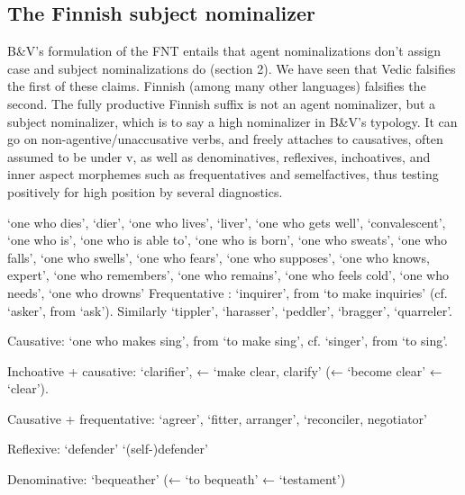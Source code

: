 \documentclass[output=paper,
modfonts
]{LSP/langsci}
\begin{document}
\subsection{The Finnish subject nominalizer }
\label{finnsectionja}
B\&V's formulation of the FNT entails that agent nominalizations don't assign case and subject
nominalizations do (section 2).  We have seen that Vedic falsifies the first of these claims.
Finnish (among many other languages) falsifies the second.  The fully productive Finnish suffix
 is not an agent nominalizer, but a subject nominalizer, which is to say a high
nominalizer in B\&V's typology.  It can go on non-agentive/unaccusative verbs, and freely
attaches to causatives, often assumed to be under v, as well as denominatives, reflexives,
inchoatives, and inner aspect morphemes such as frequentatives and semelfactives, thus testing
positively for high position by several diagnostics.
\begin{exe}
\ex
  \ea
   `one who dies', `dier',  `one who lives', `liver',
   `one who gets well', `convalescent',  `one who is',
   `one who is able to',  `one who is born', 
  `one who sweats',  `one who falls',  `one who swells',
   `one who fears',  `one who supposes',  `one
  who knows, expert',  `one who remembers',  `one who remains',
   `one who feels cold',  `one who needs', 
  `one who drowns'
\ex
	\ea Frequentative :  `inquirer', from  `to
  make inquiries' (cf.\  `asker', from  `ask'). Similarly
   `tippler',  `harasser', 
  `peddler',  `bragger',  `quarreler'.

	\ex Causative:  `one who makes sing', from  `to make
  sing', cf.  `singer', from  `to sing'.

	\ex Inchoative + causative:  `clarifier', ←  
  `make clear, clarify' (←  `become clear' ←  `clear'). 


	\ex Causative + frequentative:  `agreer',  `fitter, arranger',
   `reconciler, negotiator'


	\ex Reflexive:  `defender'   `(self-)defender'

	\ex Denominative:   `bequeather' (←  `to
  bequeath' ←   `testament')
	\z
\z
 \end{exe} 
\end{document}
